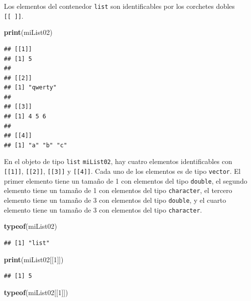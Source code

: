 \documentclass[]{book}
\newenvironment{Shaded}{\begin{snugshade}}{\end{snugshade}}
\newcommand{\KeywordTok}[1]{\textcolor[rgb]{0.13,0.29,0.53}{\textbf{#1}}}
\newcommand{\DecValTok}[1]{\textcolor[rgb]{0.00,0.00,0.81}{#1}}
\newcommand{\NormalTok}[1]{#1}
\begin{document}
Los elementos del contenedor \texttt{list} son identificables por los
corchetes dobles \texttt{{[}{[}\ {]}{]}}.

\begin{Shaded}
\begin{Highlighting}[]
\KeywordTok{print}\NormalTok{(miList02)}
\end{Highlighting}
\end{Shaded}

\begin{verbatim}
## [[1]]
## [1] 5
## 
## [[2]]
## [1] "qwerty"
## 
## [[3]]
## [1] 4 5 6
## 
## [[4]]
## [1] "a" "b" "c"
\end{verbatim}

En el objeto de tipo \texttt{list} \texttt{miList02}, hay cuatro
elementos identificables con \texttt{{[}{[}1{]}{]}},
\texttt{{[}{[}2{]}{]}}, \texttt{{[}{[}3{]}{]}} y \texttt{{[}{[}4{]}{]}}.
Cada uno de los elementos es de tipo \texttt{vector}. El primer elemento
tiene un tamaño de 1 con elementos del tipo \texttt{double}, el segundo
elemento tiene un tamaño de 1 con elementos del tipo \texttt{character},
el tercero elemento tiene un tamaño de 3 con elementos del tipo
\texttt{double}, y el cuarto elemento tiene un tamaño de 3 con elementos
del tipo \texttt{character}.

\begin{Shaded}
\begin{Highlighting}[]
\KeywordTok{typeof}\NormalTok{(miList02)}
\end{Highlighting}
\end{Shaded}

\begin{verbatim}
## [1] "list"
\end{verbatim}

\begin{Shaded}
\begin{Highlighting}[]
\KeywordTok{print}\NormalTok{(miList02[[}\DecValTok{1}\NormalTok{]])}
\end{Highlighting}
\end{Shaded}

\begin{verbatim}
## [1] 5
\end{verbatim}

\begin{Shaded}
\begin{Highlighting}[]
\KeywordTok{typeof}\NormalTok{(miList02[[}\DecValTok{1}\NormalTok{]])}
\end{Highlighting}
\end{Shaded}
\end{document}
